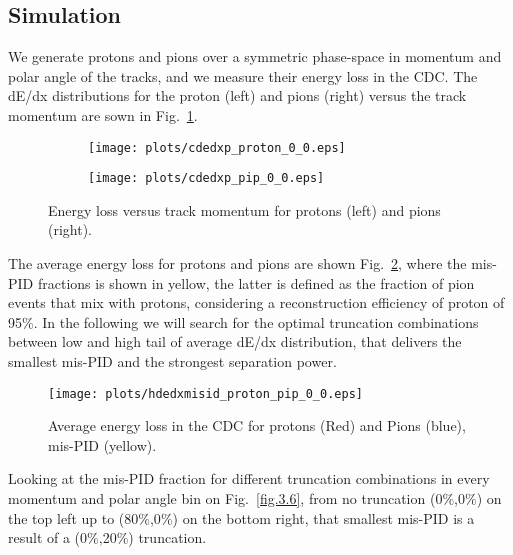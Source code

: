 \subsection{Simulation}
We generate protons and pions over a symmetric phase-space in momentum and polar angle of the tracks, and we measure their energy loss in the CDC. The dE/dx distributions for the proton (left) and pions (right) versus the track momentum are sown in Fig.~\ref{fig.3.4}.
\begin{figure}[H]
    \centering
    \begin{subfigure}[b]{0.45\textwidth}
        \texttt{[image: plots/cdedxp\_proton\_0\_0.eps]}
    \end{subfigure}\hfill
    \begin{subfigure}[b]{0.45\textwidth}
        \texttt{[image: plots/cdedxp\_pip\_0\_0.eps]}
    \end{subfigure}
    \caption{Energy loss versus track momentum for protons (left) and pions (right).}
    \label{fig.3.4}
\end{figure}
The average energy loss for protons and pions are shown Fig.~\ref{fig.3.5}, where the mis-PID fractions is shown in yellow, the latter is defined as the fraction of pion events that mix with protons, considering a reconstruction efficiency of proton of 95$\%$. In the following we will search for the optimal truncation combinations between low and high tail of average dE/dx distribution, that delivers the smallest mis-PID and the strongest separation power.
\begin{figure}[H]
    \centering
    \texttt{[image: plots/hdedxmisid\_proton\_pip\_0\_0.eps]}
    \caption{\label{fig.3.5}Average energy loss in the CDC for protons (Red) and Pions (blue), mis-PID (yellow).}
\end{figure}
Looking at the mis-PID fraction for different truncation combinations in every momentum and polar angle bin on Fig.~\ref{fig.3.6}, from no truncation (0$\%$,0$\%$) on the top left up to (80$\%$,0$\%$) on the bottom right, that smallest mis-PID is a result of a (0$\%$,20$\%$) truncation.
